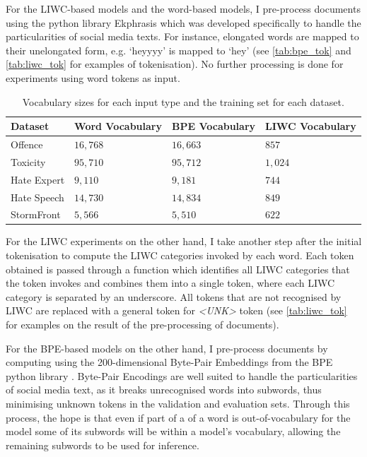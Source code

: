 For the LIWC-based models and the word-based models, I pre-process documents using the python library Ekphrasis \citep{baziotis:2017} which was developed specifically to handle the particularities of social media texts.
For instance, elongated words are mapped to their unelongated form, e.g. `heyyyy' is mapped to `hey' (see \cref{tab:bpe_tok} and \cref{tab:liwc_tok} for examples of tokenisation).
No further processing is done for experiments using word tokens as input.

\begin{table}[]
  \centering
  \begin{tabular}{llll}
    Dataset     & Word Vocabulary & BPE Vocabulary & LIWC Vocabulary \\\hline
    Offence     & $16,768$        & $16,663$       & $857$           \\
    Toxicity    & $95,710$        & $95,712$       & $1,024$         \\
    Hate Expert & $9,110$         & $9,181$        & $744$           \\
    Hate Speech & $14,730$        & $14,834$       & $849$           \\
    StormFront  & $5,566$         & $5,510$        & $622$
  \end{tabular}
  \caption{Vocabulary sizes for each input type and the training set for each dataset.}
  \label{tab:vocab_sizes}
\end{table}

For the LIWC experiments on the other hand, I take another step after the initial tokenisation to compute the LIWC categories invoked by each word. 
Each token obtained is passed through a function which identifies all LIWC categories that the token invokes and combines them into a single token, where each LIWC category is separated by an underscore.
All tokens that are not recognised by LIWC are replaced with a general token for \textit{<UNK>} token (see \cref{tab:liwc_tok} for examples on the result of the pre-processing of documents).

For the BPE-based models on the other hand, I pre-process documents by computing using the 200-dimensional Byte-Pair Embeddings from the BPE python library \citep{Heinzerling:2018}.
Byte-Pair Encodings are well suited to handle the particularities of social media text, as it breaks unrecognised words into subwords, thus minimising unknown tokens in the validation and evaluation sets.
Through this process, the hope is that even if part of a of a word is out-of-vocabulary for the model some of its subwords will be within a model's vocabulary, allowing the remaining subwords to be used for inference.

